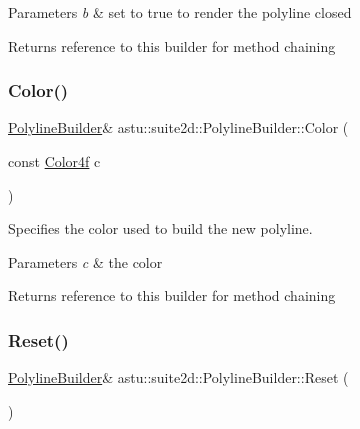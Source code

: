 \begin{DoxyParams}{Parameters}
{\em b} & set to {\ttfamily true} to render the polyline closed \\
\hline
\end{DoxyParams}
\begin{DoxyReturn}{Returns}
reference to this builder for method chaining 
\end{DoxyReturn}
\mbox{\label{classastu_1_1suite2d_1_1PolylineBuilder_a82a2c90c19baa65e7744251e3e4bc912}} 
\subsubsection{\texorpdfstring{Color()}{Color()}}
{\footnotesize\ttfamily \hyperlink{classastu_1_1suite2d_1_1PolylineBuilder}{Polyline\+Builder}\& astu\+::suite2d\+::\+Polyline\+Builder\+::\+Color (\begin{DoxyParamCaption}\item[{const \hyperlink{classastu_1_1Color}{Color4f}}]{c }\end{DoxyParamCaption})\hspace{0.3cm}{\ttfamily [inline]}}

Specifies the color used to build the new polyline.


\begin{DoxyParams}{Parameters}
{\em c} & the color \\
\hline
\end{DoxyParams}
\begin{DoxyReturn}{Returns}
reference to this builder for method chaining 
\end{DoxyReturn}
\mbox{\label{classastu_1_1suite2d_1_1PolylineBuilder_a292fa2f729bf07f05b1496bdb854208b}} 
\subsubsection{\texorpdfstring{Reset()}{Reset()}}
{\footnotesize\ttfamily \hyperlink{classastu_1_1suite2d_1_1PolylineBuilder}{Polyline\+Builder}\& astu\+::suite2d\+::\+Polyline\+Builder\+::\+Reset (\begin{DoxyParamCaption}{ }\end{DoxyParamCaption})\hspace{0.3cm}{\ttfamily [inline]}}

